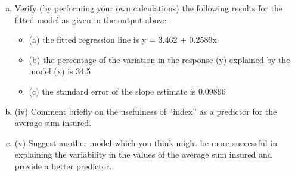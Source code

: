 \documentclass[a4paper,12pt]{article}
\begin{document}
\begin{enumerate}[(a)]
\item Verify (by performing your own calculations) the following results for the fitted model as given in the output above:
\begin{itemize}
\item (a) the fitted regression line is y = 3.462 + 0.2589x
\item (b) the percentage of the variation in the response (y) explained by the model (x) is 34.5%
\item (c) the standard error of the slope estimate is 0.09896
\end{itemize}
\item (iv) Comment briefly on the usefulness of “index” as a predictor for the average sum insured.
\item 
(v) Suggest another model which you think might be more successful in explaining the variability in the values of the average sum insured and provide a better predictor.
\end{enumerate}
\newpage
\end{document}
